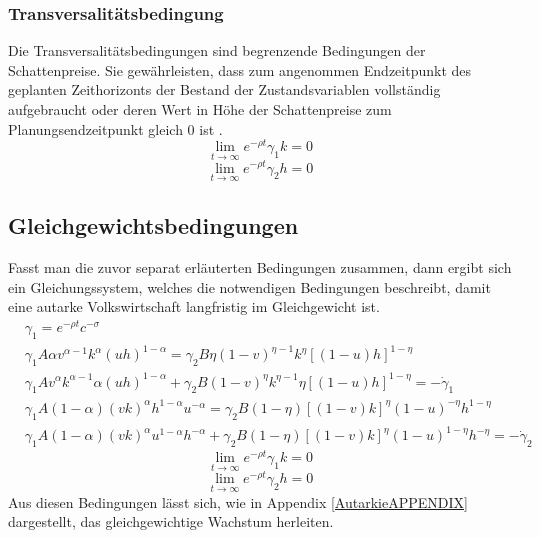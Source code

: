 \subsubsection*{Transversalitätsbedingung}
Die Transversalitätsbedingungen sind begrenzende Bedingungen der Schattenpreise. Sie gewährleisten, dass zum angenommen Endzeitpunkt des geplanten Zeithorizonts der Bestand der Zustandsvariablen vollständig aufgebraucht oder deren Wert in Höhe der Schattenpreise zum Planungsendzeitpunkt gleich $0$ ist \citep{Chiang.2000}.
\begin{equation} \lim_{t \to \infty}e^{-\rho t}\gamma_1k=0\end{equation}
\vspace{-0.7cm}
\begin{equation} \lim_{t \to \infty}e^{-\rho t}\gamma_2h=0\end{equation}

\subsection*{Gleichgewichtsbedingungen}
Fasst man die zuvor separat erläuterten Bedingungen zusammen, dann ergibt sich ein Gleichungssystem, welches die notwendigen Bedingungen beschreibt, damit eine autarke Volkswirtschaft langfristig im Gleichgewicht ist. 
\begin{align}
&\gamma_1=e^{-\rho t}c^{-\sigma}\\
&\gamma_1A\alpha v^{\alpha-1}k^\alpha(uh)^{1-\alpha}=\gamma_2B\eta(1-v)^{\eta-1}k^\eta[(1-u)h]^{1-\eta}\\
&\gamma_{1}A v^{\alpha}k^{\alpha -1} \alpha(u h)^{1- \alpha} + \gamma_{2}B(1- v)^{\eta} k^{\eta -1} \eta \left [ (1-u)h \right ]^{1- \eta}= - \dot{\gamma}_{1}\label{foc3IL}\\
&\gamma_1A(1-\alpha)(vk)^{\alpha}h^{1-\alpha}u^{-\alpha}=\gamma_2B(1-\eta)[(1-v)k]^\eta (1-u)^{-\eta} h^{1-\eta}\\
&\gamma_1A(1-\alpha)(vk)^\alpha u^{1-\alpha}h^{-\alpha}+\gamma_2 B(1-\eta)[(1-v)k]^{\eta}(1-u)^{1-\eta}h^{-\eta}=-\dot{\gamma}_2
\end{align}
\vspace{-0.7cm}
\begin{equation} \lim_{t \to \infty}e^{-\rho t}\gamma_1k=0\end{equation}
\vspace{-0.7cm}
\begin{equation} \lim_{t \to \infty}e^{-\rho t}\gamma_2h=0\end{equation}
Aus diesen Bedingungen lässt sich, wie in Appendix \ref{AutarkieAPPENDIX} dargestellt, das gleichgewichtige Wachstum herleiten. 


